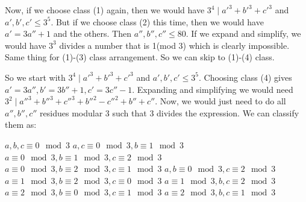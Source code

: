 \begin{enumerate}
 Now, if we choose class (1) again, then we would have $3^{4} \mid a'^{3} + b'^{3} + c'^{3}$ and $a', b', c' \leq 3^{5}$. But if we choose class (2) this time, then we would have $a' = 3a'' + 1$ and the others. Then $a'', b'', c'' \leq 80$. If we expand and simplify, we would have $3^{3}$ divides a number that is 1(mod 3) which is clearly impossible. Same thing for (1)-(3) class arrangement. So we can skip to (1)-(4) class. 

 So we start with $3^{4} \mid a'^{3} + b'^{3} + c'^{3}$ and $a', b', c' \leq 3^{5}$. Choosing class (4) gives $a' = 3a'', b' = 3b'' + 1, c' = 3c'' - 1$. Expanding and simplifying we would need $3^{2} \mid a''^{3} + b''^{3} + c''^{3} + b''^{2} - c''^{2} + b'' + c''$. Now, we would just need to do all $a'', b'', c''$ residues modular 3 such that 3 divides the expression. We can classify them as:

 $a,b,c \equiv 0\mod 3$
$a,c \equiv 0\mod 3, b \equiv 1\mod 3$
$a \equiv 0\mod 3, b \equiv 1\mod 3, c \equiv 2\mod 3$
$a \equiv 0\mod 3, b \equiv 2\mod 3, c \equiv 1\mod 3$
$a,b \equiv 0\mod 3, c \equiv 2\mod 3$
$a \equiv 1\mod 3, b \equiv 2\mod 3, c \equiv 0\mod 3$
$a \equiv 1\mod 3, b,c \equiv 2\mod 3$
$a \equiv 2\mod 3, b \equiv 0\mod 3, c \equiv 1\mod 3$
$a \equiv 2\mod 3, b,c \equiv 1\mod 3$


\end{enumerate}
